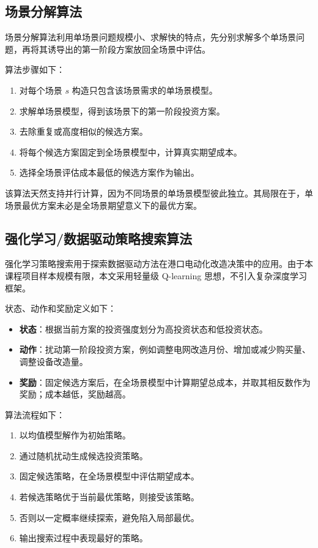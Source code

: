 \documentclass[12pt,a4paper]{article}
\newcommand{\手批注}[2]{\textcolor{#1}{\text{\kaishu #2}}}
\newcommand{\一阶段}{\textcolor{firststage}{\text{\kaishu （一阶段）}}}
\newcommand{\二阶段}{\textcolor{secondstage}{\text{\kaishu （二阶段）}}}
\begin{document}
\subsection{场景分解算法}

场景分解算法利用单场景问题规模小、求解快的特点，先分别求解多个单场景问题，再将其诱导出的第一阶段方案放回全场景中评估。

算法步骤如下：
\begin{enumerate}[itemsep=0.2em,leftmargin=2em]
    \item 对每个场景 $s$ 构造只包含该场景需求的单场景模型。
    \item 求解单场景模型，得到该场景下的第一阶段投资方案。
    \item 去除重复或高度相似的候选方案。
    \item 将每个候选方案固定到全场景模型中，计算真实期望成本。
    \item 选择全场景评估成本最低的候选方案作为输出。
\end{enumerate}

该算法天然支持并行计算，因为不同场景的单场景模型彼此独立。其局限在于，单场景最优方案未必是全场景期望意义下的最优方案。

\subsection{强化学习/数据驱动策略搜索算法}

强化学习策略搜索用于探索数据驱动方法在港口电动化改造决策中的应用。由于本课程项目样本规模有限，本文采用轻量级 Q-learning 思想，不引入复杂深度学习框架。

状态、动作和奖励定义如下：
\begin{itemize}[itemsep=0.2em,leftmargin=2em]
    \item \textbf{状态}：根据当前方案的投资强度划分为高投资状态和低投资状态。
    \item \textbf{动作}：扰动第一阶段投资方案，例如调整电网改造月份、增加或减少购买量、调整设备改造量。
    \item \textbf{奖励}：固定候选方案后，在全场景模型中计算期望总成本，并取其相反数作为奖励；成本越低，奖励越高。
\end{itemize}

算法流程如下：
\begin{enumerate}[itemsep=0.2em,leftmargin=2em]
    \item 以均值模型解作为初始策略。
    \item 通过随机扰动生成候选投资策略。
    \item 固定候选策略，在全场景模型中评估期望成本。
    \item 若候选策略优于当前最优策略，则接受该策略。
    \item 否则以一定概率继续探索，避免陷入局部最优。
    \item 输出搜索过程中表现最好的策略。
\end{enumerate}
\end{document}

